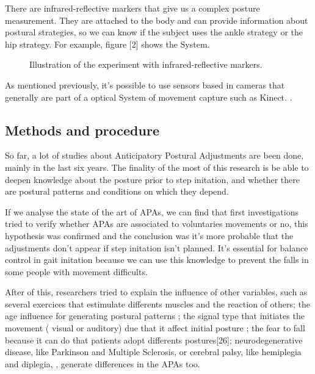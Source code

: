 There are  infrared-reflective markers that give us a complex posture measurement. They are attached  to the body and can provide information about postural strategies, so we can know if the subject uses the ankle strategy or the hip strategy. For example, figure [2] shows the System.

\begin{figure}[H]
	\centering
	\caption{Illustration of the experiment with infrared-reflective markers\cite{Teddy2013}.}
	\label{fig:arte2}
\end{figure}

As mentioned previously, it's possible to use sensors based in cameras that generally are part of a optical System of movement capture such  as Kinect. \cite{Instr5}.


\subsection{Methods and procedure}

So far, a lot of studies about Anticipatory Postural Adjustments are been done, mainly in the  last six years. The finality of the most of this research is be able to deepen knowledge about the posture prior to step initation, and whether there are postural patterns and conditions on which they depend.

If we analyse the state of the art of APAs, we can find that first investigations tried to verify whether APAs are associated to voluntaries movements or no,  this hypothesis was confirmed and the conclusion was it’s more probable that the adjustments don’t appear if step initation isn’t planned. It’s essential for balance control in gait initation because we can use this knowledge to prevent the falls in some people with movement difficults.\cite{Mcllroy1993}\cite{Yiou2012}\cite{Teddy2013}\cite{Bouisset2008}\cite{Neeta2014}

After of this, researchers tried to explain the influence of other variables, such as several exercices that estimulate differents muscles and the reaction of others\cite{Gay2011}; the age influence for generating postural patterns \cite{Bleuse2006} \cite{Estelle2008}; the signal type that initiates the movement ( visual or auditory) due that it affect initial posture \cite{Mcllroy1993}\cite{Antonia2009}\cite{Vicent1999}\cite{Tard2013}; the fear to fall because it can do that patients adopt differents postures[26]; neurodegenerative disease, like Parkinson and Multiple Sclerosis\cite{Mancini2009}\cite{Jebb2008}\cite{Chris2005}\cite{Hall2013}, or cerebral palsy, like hemiplegia and diplegia, \cite{Hall2013}, generate differences in the APAs too.

